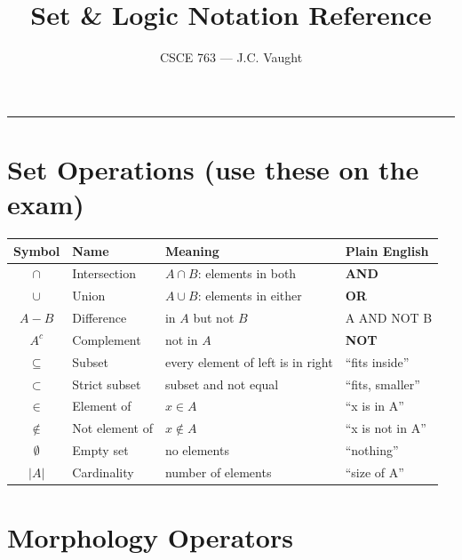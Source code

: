 \documentclass[11pt]{article}
\title{\color{garnet}\textbf{Set \& Logic Notation Reference}}
\author{CSCE 763 --- J.C. Vaught}
\date{}
\begin{document}
\maketitle
\vspace{-2em}
\hrule
\vspace{1em}

\section{Set Operations (use these on the exam)}

\begin{tcolorbox}[refbox]
\begin{tabular}{@{}clll@{}}
\toprule
\textbf{Symbol} & \textbf{Name} & \textbf{Meaning} & \textbf{Plain English} \\
\midrule
$\cap$ & Intersection & $A \cap B$: elements in both & \textbf{AND} \\
$\cup$ & Union & $A \cup B$: elements in either & \textbf{OR} \\
$A - B$ & Difference & in $A$ but not $B$ & A AND NOT B \\
$A^c$ & Complement & not in $A$ & \textbf{NOT} \\
$\subseteq$ & Subset & every element of left is in right & ``fits inside'' \\
$\subset$ & Strict subset & subset and not equal & ``fits, smaller'' \\
$\in$ & Element of & $x \in A$ & ``x is in A'' \\
$\notin$ & Not element of & $x \notin A$ & ``x is not in A'' \\
$\emptyset$ & Empty set & no elements & ``nothing'' \\
$|A|$ & Cardinality & number of elements & ``size of A'' \\
\bottomrule
\end{tabular}
\end{tcolorbox}

\section{Morphology Operators}
\end{document}
